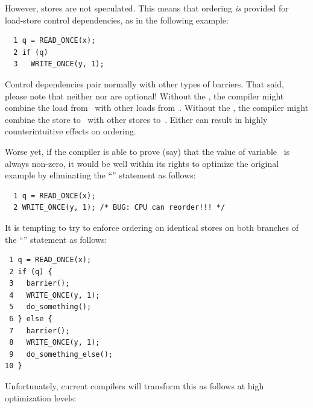 \begin{enumerate}
However, stores are not speculated.
This means that ordering \emph{is} provided for load-store control
dependencies, as in the following example:

\vspace{5pt}
\begin{minipage}[t]{\columnwidth}
\scriptsize
\begin{verbatim}
  1 q = READ_ONCE(x);
  2 if (q)
  3   WRITE_ONCE(y, 1);
\end{verbatim}
\end{minipage}
\vspace{5pt}

Control dependencies pair normally with other types of barriers.
That said, please note that neither  nor 
are optional!
Without the , the compiler might combine the load
from~ with other loads from~.
Without the , the compiler might combine the store
to~ with other stores to~.
Either can result in highly counterintuitive effects on ordering.

Worse yet, if the compiler is able to prove (say) that the value of
variable~ is always non-zero, it would be well within its rights
to optimize the original example by eliminating the ``'' statement
as follows:

\vspace{5pt}
\begin{minipage}[t]{\columnwidth}
\scriptsize
\begin{verbatim}
  1 q = READ_ONCE(x);
  2 WRITE_ONCE(y, 1); /* BUG: CPU can reorder!!! */
\end{verbatim}
\end{minipage}
\vspace{5pt}

It is tempting to try to enforce ordering on identical stores on both
branches of the ``'' statement as follows:

\vspace{5pt}
\begin{minipage}[t]{\columnwidth}
\scriptsize
\begin{verbatim}
 1 q = READ_ONCE(x);
 2 if (q) {
 3   barrier();
 4   WRITE_ONCE(y, 1);
 5   do_something();
 6 } else {
 7   barrier();
 8   WRITE_ONCE(y, 1);
 9   do_something_else();
10 }
\end{verbatim}
\end{minipage}
\vspace{5pt}

Unfortunately, current compilers will transform this as follows at high
optimization levels:


\end{enumerate}
